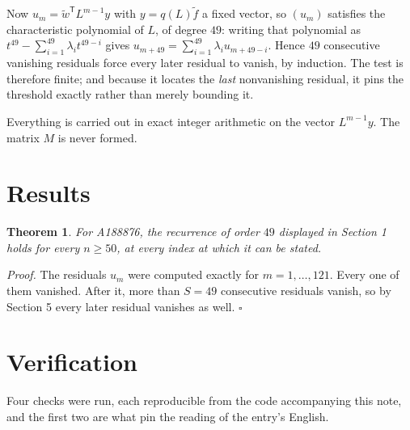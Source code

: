 \documentclass[11pt]{article}
\newtheorem{theorem}{Theorem}
\theoremstyle{definition}
\begin{document}
Now $u_m = \tilde w^{\mathsf T} L^{m-1} y$ with $y = q(L)\tilde f$ a fixed vector, so $(u_m)$ satisfies the characteristic polynomial of $L$, of degree $49$: writing that polynomial as $t^{49} - \sum_{i=1}^{49} \lambda_i t^{49-i}$ gives $u_{m+49} = \sum_{i=1}^{49} \lambda_i u_{m+49-i}$. Hence $49$ consecutive vanishing residuals force every later residual to vanish, by induction. The test is therefore finite; and because it locates the {\itshape last} nonvanishing residual, it pins the threshold exactly rather than merely bounding it.

Everything is carried out in exact integer arithmetic on the vector $L^{m-1}y$. The matrix $M$ is never formed.

\section{Results}

\begin{theorem} For A188876, the recurrence of order $49$ displayed in Section 1 holds for every $n \ge 50$, at every index at which it can be stated.\end{theorem}

{\itshape Proof.} The residuals $u_m$ were computed exactly for $m = 1,\dots,121$. Every one of them vanished. After it, more than $S = 49$ consecutive residuals vanish, so by Section 5 every later residual vanishes as well. $\square$

\section{Verification}

Four checks were run, each reproducible from the code accompanying this note, and the first two are what pin the reading of the entry's English.
\end{document}
